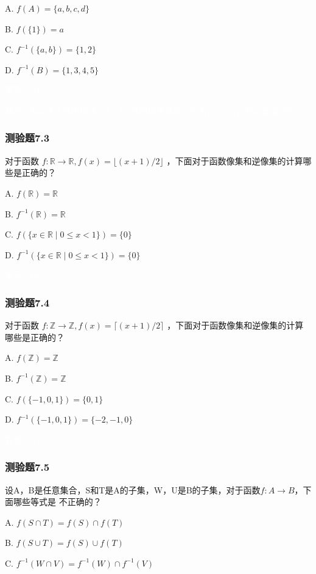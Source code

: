\documentclass[UTF8, heading=true]{ctexart}
\begin{document}
A. 
$f(A)=\{a, b, c, d\}$

B. 
$f(\{1\})=a$

C. $f^{-1}(\{a, b\})=\{1,2\}$

D. $f^{-1}(B)=\{1,3,4,5\}$

\textcolor{white}{答案：AC}

\textcolor{white}{解析：私以为A选项错误。$f(A)$求的就是值域，应为$\{ a,c,d \}$，所以答案应为C。}

\subsubsection{测验题7.3}

对于函数 $f: \mathbb{R} \rightarrow \mathbb{R}, f(x)=\lfloor(x+1) / 2\rfloor$ ，下面对于函数像集和逆像集的计算哪些是正确的？

A. $f(\mathbb{R})=\mathbb{R}$

B. $f^{-1}(\mathbb{R})=\mathbb{R}$

C. $f(\{x \in \mathbb{R} \mid 0 \leq x<1\})=\{0\}$

D. $f^{-1}(\{x \in \mathbb{R} \mid 0 \leq x<1\})=\{0\}$

\textcolor{white}{答案：BC}

\subsubsection{测验题7.4}

对于函数 $f: \mathbb{Z} \rightarrow \mathbb{Z}, f(x)=\lceil(x+1) / 2\rceil$ ，下面对于函数像集和逆像集的计算哪些是正确的？

A. $
f(\mathbb{Z})=\mathbb{Z}
$


B. $
f^{-1}(\mathbb{Z})=\mathbb{Z}
$


C. $
f(\{-1,0,1\})=\{0,1\}
$


D.  $
f^{-1}(\{-1,0,1\})=\{-2,-1,0\}
$

\textcolor{white}{答案：ABC}

\subsubsection{测验题7.5}

设A，B是任意集合，S和T是A的子集，W，U是B的子集，对于函数$f:A\rightarrow B$，下面哪些等式是
不正确的？

A. $f(S \cap T)=f(S) \cap f(T)$

B. $f(S \cup T)=f(S) \cup f(T)$

C. $f^{-1}(W \cap V)=f^{-1}(W) \cap f^{-1}(V)$
\end{document}
